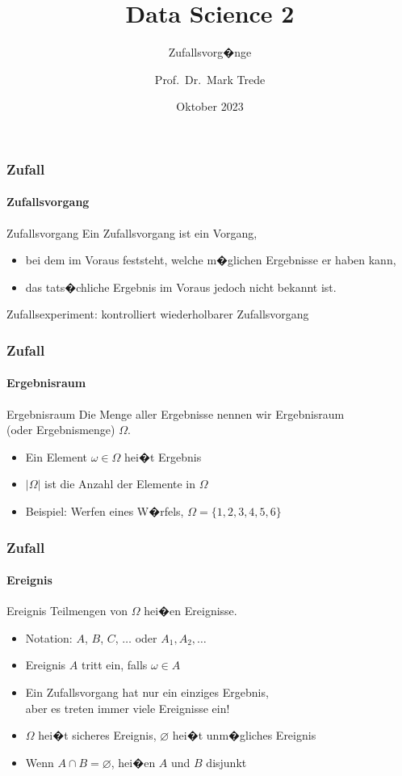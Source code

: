 \documentclass[12pt,show notes]{beamer}
\begin{document}
\title{Data Science 2}
\subtitle{Zufallsvorg�nge}
\author{Prof.~Dr.~Mark Trede}
\date{Oktober 2023}
\maketitle

\begin{frame}
\frametitle{Zufall}
\framesubtitle{Zufallsvorgang}
\begin{block}{Zufallsvorgang}
Ein Zufallsvorgang ist ein Vorgang, 
\begin{itemize}
\item bei dem im Voraus feststeht,
welche m�glichen Ergebnisse er haben kann,
\item das tats�chliche Ergebnis im Voraus jedoch nicht bekannt ist.
\end{itemize}
\end{block}
\medskip
Zufallsexperiment: kontrolliert wiederholbarer Zufallsvorgang
\end{frame}

\begin{frame}
\frametitle{Zufall}
\framesubtitle{Ergebnisraum}
\begin{block}{Ergebnisraum}
Die Menge aller Ergebnisse nennen wir Ergebnisraum\\
(oder Ergebnismenge) $\Omega$.
\end{block}
\begin{itemize}
\item Ein Element $\omega \in \Omega $ hei�t Ergebnis 
\item $|\Omega|$ ist die Anzahl der Elemente in $\Omega $
\item Beispiel: Werfen eines W�rfels, $\Omega =\{1,2,3,4,5,6\}$
\end{itemize}
\end{frame}

\begin{frame}
\frametitle{Zufall}
\framesubtitle{Ereignis}
\begin{block}{Ereignis}
Teilmengen von $\Omega$ hei�en Ereignisse.
\end{block}
\begin{itemize}
\item Notation: $A$, $B$, $C$, $\ldots $ oder $A_{1},A_{2},\ldots $
\item Ereignis $A$ tritt ein, falls $\omega \in A$
\item Ein Zufallsvorgang hat nur ein einziges Ergebnis,\\
aber es treten immer viele Ereignisse ein!
\item $\Omega$ hei�t sicheres Ereignis, $\varnothing$ hei�t unm�gliches Ereignis
\item Wenn $A\cap B=\varnothing$, hei�en $A$ und $B$ disjunkt
\end{itemize}
\end{frame}
\end{document}
